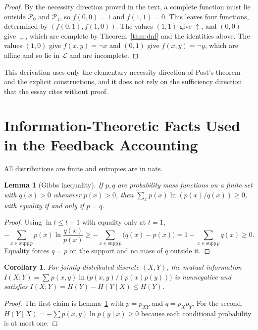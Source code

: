 \documentclass[11pt]{article}
\newtheorem{lemma}{Lemma}
\newtheorem{corollary}{Corollary}
\theoremstyle{definition}
\theoremstyle{remark}
\newcommand{\nand}{\uparrow}
\begin{document}
\begin{proof}
By the necessity direction proved in the text, a complete function must lie outside $\mathcal{P}_0$ and $\mathcal{P}_1$, so $f(0,0) = 1$ and $f(1,1) = 0$. This leaves four functions, determined by $(f(0,1), f(1,0))$. The values $(1,1)$ give $\nand$, and $(0,0)$ give $\downarrow$, which are complete by Theorem~\ref{thm:dnf} and the identities above. The values $(1,0)$ give $f(x,y) = \neg x$ and $(0,1)$ give $f(x,y) = \neg y$, which are affine and so lie in $\mathcal{L}$ and are incomplete.
\end{proof}

This derivation uses only the elementary necessity direction of Post's theorem and the explicit constructions, and it does not rely on the sufficiency direction that the essay cites without proof.

\section{Information-Theoretic Facts Used in the Feedback Accounting}\label{app:info}

All distributions are finite and entropies are in nats.

\begin{lemma}[Gibbs inequality]\label{lem:gibbs}
If $p, q$ are probability mass functions on a finite set with $q(x) > 0$ whenever $p(x) > 0$, then $\sum_x p(x) \ln (p(x)/q(x)) \ge 0$, with equality if and only if $p = q$.
\end{lemma}

\begin{proof}
Using $\ln t \le t - 1$ with equality only at $t = 1$,
\[
-\sum_{x \in \mathrm{supp}\,p} p(x) \ln \frac{q(x)}{p(x)} \ge -\sum_{x \in \mathrm{supp}\,p} \big(q(x) - p(x)\big) = 1 - \sum_{x \in \mathrm{supp}\,p} q(x) \ge 0 .
\]
 Equality forces $q = p$ on the support and no mass of $q$ outside it.
\end{proof}

\begin{corollary}\label{cor:info}
For jointly distributed discrete $(X, Y)$, the mutual information $I(X;Y) = \sum p(x,y) \ln \big(p(x,y)/(p(x) p(y))\big)$ is nonnegative and satisfies $I(X;Y) = H(Y) - H(Y \mid X) \le H(Y)$.
\end{corollary}

\begin{proof}
The first claim is Lemma~\ref{lem:gibbs} with $p = p_{XY}$ and $q = p_X p_Y$. For the second, $H(Y \mid X) = -\sum p(x,y) \ln p(y \mid x) \ge 0$ because each conditional probability is at most one.
\end{proof}
\end{document}
